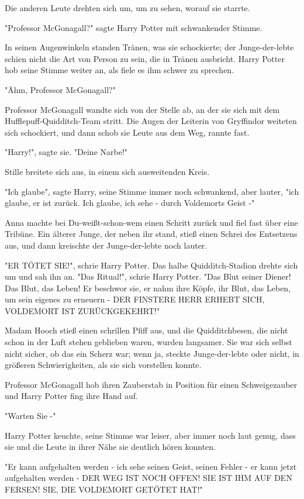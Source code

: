 {Die anderen Leute drehten sich um, um zu sehen, worauf sie starrte.

"Professor McGonagall?" sagte Harry Potter mit schwankender Stimme.

In seinen Augenwinkeln standen Tränen, was sie schockierte; der Junge-der-lebte schien nicht die Art von Person zu sein, die in Tränen ausbricht. Harry Potter hob seine Stimme weiter an, als fiele es ihm schwer zu sprechen.

"Ähm, Professor McGonagall?"

Professor McGonagall wandte sich von der Stelle ab, an der sie sich mit dem Hufflepuff-Quidditch-Team stritt. Die Augen der Leiterin von Gryffindor weiteten sich schockiert, und dann schob sie Leute aus dem Weg, rannte fast.

"Harry!", sagte sie. "Deine Narbe!"

Stille breitete sich aus, in einem sich ausweitenden Kreis.

"Ich glaube", sagte Harry, seine Stimme immer noch schwankend, aber lauter, "ich glaube, er ist zurück. Ich glaube, ich sehe - durch Voldemorts Geist -"

Anna machte bei Du-weißt-schon-wem einen Schritt zurück und fiel fast über eine Tribüne. Ein älterer Junge, der neben ihr stand, stieß einen Schrei des Entsetzens aus, und dann kreischte der Junge-der-lebte noch lauter.

"ER TÖTET SIE!", schrie Harry Potter. Das halbe Quidditch-Stadion drehte sich um und sah ihn an. "Das Ritual!", schrie Harry Potter. "Das Blut seiner Diener! Das Blut, das Leben! Er beschwor sie, er nahm ihre Köpfe, ihr Blut, das Leben, um sein eigenes zu erneuern - DER FINSTERE HERR ERHEBT SICH, VOLDEMORT IST ZURÜCKGEKEHRT!"

Madam Hooch stieß einen schrillen Pfiff aus, und die Quidditchbesen, die nicht schon in der Luft stehen geblieben waren, wurden langsamer. Sie war sich selbst nicht sicher, ob das ein Scherz war; wenn ja, steckte Junge-der-lebte oder nicht, in größeren Schwierigkeiten, als sie sich vorstellen konnte.

Professor McGonagall hob ihren Zauberstab in Position für einen Schweigezauber und Harry Potter fing ihre Hand auf.

"Warten Sie -"

Harry Potter keuchte, seine Stimme war leiser, aber immer noch laut genug, dass sie und die Leute in ihrer Nähe sie deutlich hören konnten.

"Er kann aufgehalten werden - ich sehe seinen Geist, seinen Fehler - er kann jetzt aufgehalten werden - DER WEG IST NOCH OFFEN! SIE IST IHM AUF DEN FERSEN! SIE, DIE VOLDEMORT GETÖTET HAT!"

}
